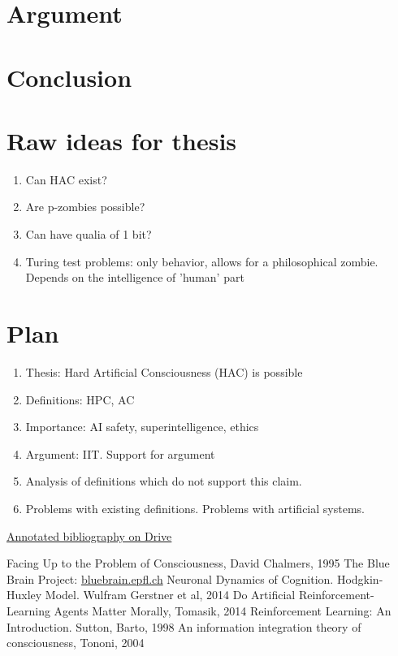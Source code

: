 \documentclass[a4paper, 12pt]{article}
\begin{document}


\section{Argument}
\section{Conclusion}
\section{Raw ideas for thesis}
\begin{enumerate}
	\item Can HAC exist?
	\item Are p-zombies possible?
	\item Can have qualia of 1 bit?
	\item Turing test problems: only behavior, allows for a philosophical zombie. Depends on the intelligence of 'human' part
\end{enumerate}
\section{Plan}
\begin{enumerate}
	\item Thesis: Hard Artificial Consciousness (HAC) is possible
	\item Definitions: HPC, AC
	\item Importance: AI safety, superintelligence, ethics
	\item Argument: IIT. Support for argument
	\item Analysis of definitions which do not support this claim.
	\item Problems with existing definitions. Problems with artificial systems.
\end{enumerate}

\href{https://docs.google.com/document/d/1kh4wC9YHNJEcCBxE1eaymw9PPa1VdCW25BH0GEIQgj4/edit#heading=h.ptmcnj925n6h}{Annotated bibliography on Drive}
\begin{thebibliography}{20}
 Facing Up to the Problem of Consciousness, David Chalmers, 1995
 The Blue Brain Project: \href{https://bluebrain.epfl.ch/}{bluebrain.epfl.ch}
 Neuronal Dynamics of Cognition. Hodgkin-Huxley Model. Wulfram Gerstner et al, 2014
 Do Artificial Reinforcement-Learning Agents Matter Morally, Tomasik, 2014
 Reinforcement Learning: An Introduction. Sutton, Barto, 1998
 An information integration theory of consciousness, Tononi, 2004
\end{thebibliography}
\end{document}
